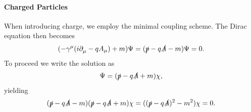 \paragraph{Charged Particles}
When introducing charge, we employ the minimal coupling scheme. The Dirac equation then becomes
\begin{align*}
	(-\gamma^{\mu}(i\partial^{}_{\mu}{} - qA_{\mu}) + m)\Psi = (\slashed{p} - q\slashed{A} - m)\Psi = 0.
\end{align*}
To proceed we write the solution as
\begin{align*}
	\Psi = (\slashed{p} - q\slashed{A} + m)\chi,
\end{align*}
yielding
\begin{align*}
	(\slashed{p} - q\slashed{A} - m)(\slashed{p} - q\slashed{A} + m)\chi = ((\slashed{p} - q\slashed{A})^{2} - m^{2})\chi = 0.
\end{align*}

